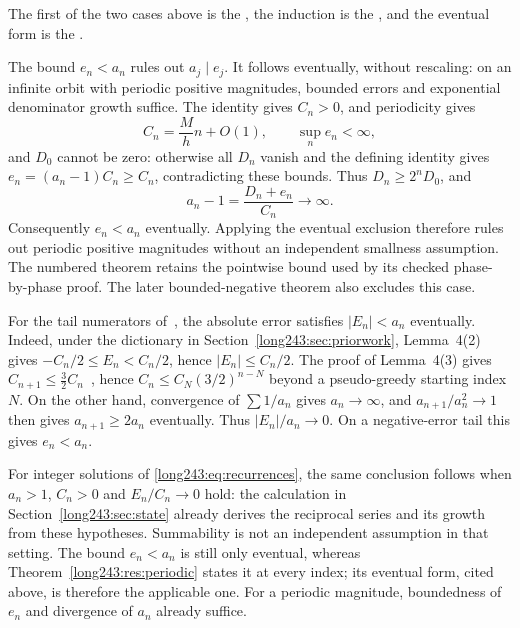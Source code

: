 \noindent The first of the two cases above is the
, the induction is the
, and the eventual form is the
.

The bound $e_n<a_n$ rules out $a_j\mid e_j$. It follows eventually,
without rescaling: on an infinite orbit with periodic positive
magnitudes, bounded errors and exponential denominator growth suffice.
The identity gives $C_n>0$, and periodicity gives
\[
 C_n=\frac{M}{h}n+O(1),\qquad \sup_ne_n<\infty,
\]
and $D_0$ cannot be zero: otherwise all $D_n$ vanish and the defining identity gives $e_n=(a_n-1)C_n\ge C_n$, contradicting these bounds.
Thus $D_n\ge2^nD_0$, and
\[
 a_n-1=\frac{D_n+e_n}{C_n}\longrightarrow\infty.
\]
Consequently $e_n<a_n$ eventually. Applying the eventual exclusion
therefore rules out periodic positive magnitudes without an independent
smallness assumption. The numbered theorem retains the pointwise bound
used by its checked phase-by-phase proof. The later bounded-negative
theorem also excludes this case.

\begin{remark}\label{long243:rem:eventual-error-bound}
For the tail numerators of~\cite{koizumi2025}, the absolute error
satisfies $|E_n|<a_n$ eventually. Indeed, under the dictionary in
Section~\ref{long243:sec:priorwork}, Lemma~4(2) gives
$-C_n/2\le E_n<C_n/2$, hence $|E_n|\le C_n/2$. The proof of Lemma~4(3) gives
$C_{n+1}\le\tfrac32C_n$~\cite[pp.~11--12]{koizumi2025}, hence
$C_n\le C_N(3/2)^{n-N}$ beyond a pseudo-greedy starting index $N$.
On the other hand, convergence of $\sum1/a_n$ gives $a_n\to\infty$,
and $a_{n+1}/a_n^2\to1$ then gives $a_{n+1}\ge2a_n$ eventually.
Thus $|E_n|/a_n\to0$. On a negative-error tail this gives $e_n<a_n$.

For integer solutions of \eqref{long243:eq:recurrences}, the same conclusion follows when
$a_n>1$, $C_n>0$ and $E_n/C_n\to0$ hold: the calculation in
Section~\ref{long243:sec:state} already derives the reciprocal series and
its growth from these hypotheses. Summability is not an independent
assumption in that setting. The bound $e_n<a_n$ is still only eventual,
whereas Theorem~\ref{long243:res:periodic} states it at every index;
its eventual form, cited above, is therefore the applicable one.
For a periodic magnitude, boundedness of $e_n$ and divergence of $a_n$
already suffice.
\end{remark}

